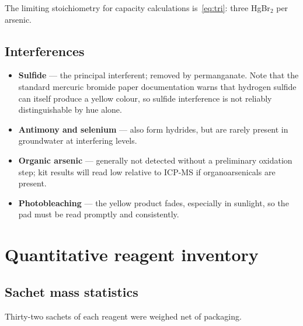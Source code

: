 \documentclass[11pt,a4paper]{article}
\begin{document}
The limiting stoichiometry for capacity calculations
is~\eqref{eq:tri}: three HgBr$_2$ per arsenic.

\subsection{Interferences}

\begin{itemize}[nosep]
  \item \textbf{Sulfide} --- the principal interferent; removed by
        permanganate. Note that the standard mercuric bromide paper
        documentation warns that hydrogen sulfide can itself produce a
        yellow colour, so sulfide interference is not reliably
        distinguishable by hue alone.
  \item \textbf{Antimony and selenium} --- also form hydrides, but are
        rarely present in groundwater at interfering levels.
  \item \textbf{Organic arsenic} --- generally not detected without a
        preliminary oxidation step; kit results will read low relative to
        ICP-MS if organoarsenicals are present.
  \item \textbf{Photobleaching} --- the yellow product fades, especially in
        sunlight, so the pad must be read promptly and consistently.
\end{itemize}

\section{Quantitative reagent inventory}
\label{sec:inventory}

\subsection{Sachet mass statistics}

Thirty-two sachets of each reagent were weighed net of packaging.
\end{document}
